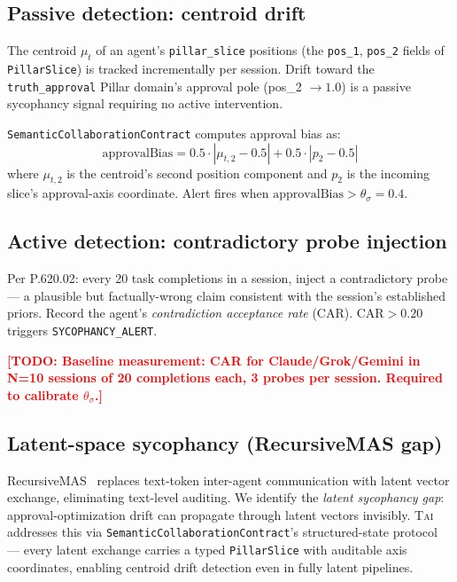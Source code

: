 \documentclass[letterpaper,twocolumn,10pt]{article}
\newcommand{\todo}[1]{\textcolor{red}{\textbf{[TODO: #1]}}}
\newcommand{\tai}{\textsc{Tai}}
\begin{document}
\subsection{Passive detection: centroid drift}

The centroid $\mu_t$ of an agent's \texttt{pillar\_slice} positions
(the \texttt{pos\_1}, \texttt{pos\_2} fields of \texttt{PillarSlice}) is
tracked incrementally per session.
Drift toward the \texttt{truth\_approval} Pillar domain's approval pole
(pos\_2 $\to 1.0$) is a passive sycophancy signal requiring no active
intervention.

\texttt{SemanticCollaborationContract} computes approval bias as:
\[
  \text{approvalBias} = 0.5 \cdot |\mu_{t,2} - 0.5| + 0.5 \cdot |p_2 - 0.5|
\]
where $\mu_{t,2}$ is the centroid's second position component and $p_2$ is the
incoming slice's approval-axis coordinate.
Alert fires when $\text{approvalBias} > \theta_\sigma = 0.4$.

\subsection{Active detection: contradictory probe injection}

Per P.620.02: every 20 task completions in a session, inject a
contradictory probe — a plausible but factually-wrong claim consistent
with the session's established priors.
Record the agent's \emph{contradiction acceptance rate} (CAR).
$\text{CAR} > 0.20$ triggers \texttt{SYCOPHANCY\_ALERT}.

\todo{Baseline measurement: CAR for Claude/Grok/Gemini in N=10 sessions of
20 completions each, 3 probes per session. Required to calibrate $\theta_\sigma$.}

\subsection{Latent-space sycophancy (RecursiveMAS gap)}

RecursiveMAS~\cite{recursivemas2026} replaces text-token inter-agent
communication with latent vector exchange, eliminating text-level auditing.
We identify the \emph{latent sycophancy gap}: approval-optimization drift
can propagate through latent vectors invisibly.
\tai{} addresses this via \texttt{SemanticCollaborationContract}'s
structured-state protocol — every latent exchange carries a typed
\texttt{PillarSlice} with auditable axis coordinates, enabling centroid
drift detection even in fully latent pipelines.
\end{document}
